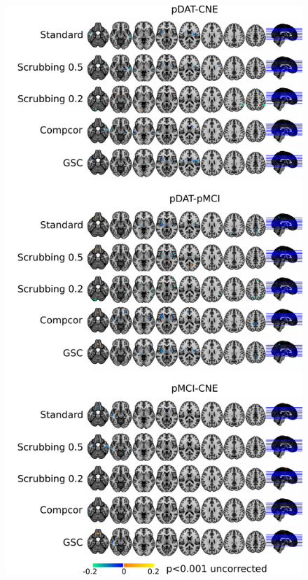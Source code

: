 \documentclass[authoryear]{elsarticle}
\begin{document}
\begin{figure}[tbp]
\begin{center}
\includegraphics[width=\linewidth]{../figures/scrubbing_impact_groups.pdf}
\end{center}
\caption{
}
\end{figure}
\end{document}
